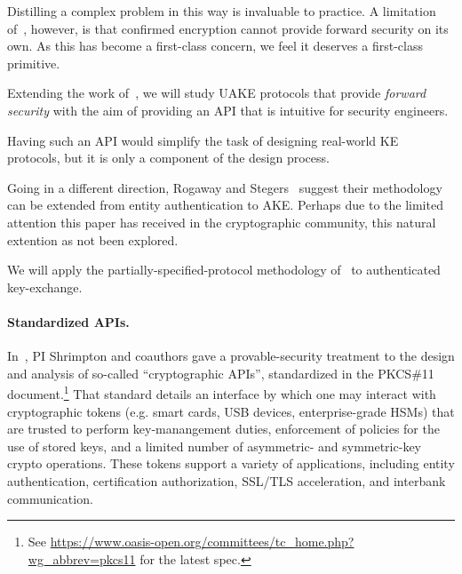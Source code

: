 Distilling a complex problem in this way is invaluable to practice. A
limitation of~\cite{dodis2017unilateral}, however, is that confirmed encryption
cannot provide forward security on its own. As this has become a first-class
concern, we feel it deserves a first-class primitive.
%

\begin{task}
  Extending the work of~\cite{dodis2017unilateral}, we will study UAKE protocols
  that provide \emph{forward security} with the aim of providing an API that is
  intuitive for security engineers.
\end{task}

\noindent
Having such an API would simplify the task of designing real-world KE
protocols, but it is only a component of the design process.

Going in a different direction, Rogaway and Stegers~\cite{RS09} suggest their
methodology can be extended from entity authentication to AKE.
Perhaps due to the limited attention this paper has received in the
cryptographic community, this natural extention as not been explored.
\begin{task}
  We will apply the partially-specified-protocol methodology of~\cite{RS09} to
  authenticated key-exchange.
\end{task}



\paragraph{Standardized APIs. }
%
In~\cite{SSW}, PI Shrimpton and coauthors gave a provable-security treatment to
the design and analysis of so-called ``cryptographic APIs'', standardized in the
PKCS\#11 document.\footnote{See
\url{https://www.oasis-open.org/committees/tc_home.php?wg_abbrev=pkcs11} for the
latest spec.} That standard details an interface by which one may interact with
cryptographic tokens (e.g. smart cards, USB devices, enterprise-grade HSMs) that
are trusted to perform key-manangement duties, enforcement of policies for the
use of stored keys, and a limited number of asymmetric- and symmetric-key crypto
operations.  These tokens support a variety of applications, including entity
authentication, certification authorization, SSL/TLS acceleration, and interbank
communication.
%

